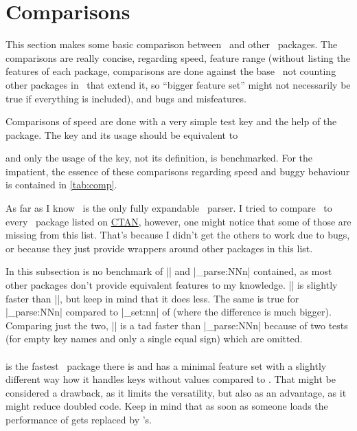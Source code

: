 \section{Comparisons}\label{sec:cmp}

This section makes some basic comparison between \expkv\ and other \kv\
packages. The comparisons are really concise, regarding speed, feature range
(without listing the features of each package, comparisons are done against the
base \expkv\ not counting other packages in \expkvbundle\ that extend it, so
\enquote{bigger feature set} might not necessarily be true if everything is
included), and bugs and misfeatures.

Comparisons of speed are done with a very simple test key and the help of the
\pkg{l3benchmark} package. The key and its usage should be equivalent to
\begin{enverb}[no-tcb]
  \protected{}
  \ekvsetdef{}
\end{enverb}
and only the usage of the key, not its definition, is benchmarked. For the
impatient, the essence of these comparisons regarding speed and buggy
behaviour is contained in \autoref{tab:comp}.

As far as I know \expkv\ is the only fully expandable \kv\ parser. I tried to
compare \expkv\ to every \kv\ package listed on
\href{https://ctan.org/topic/keyval}{CTAN}, however, one might notice that
some of those are missing from this list. That's because I didn't get the
others to work due to bugs, or because they just provide wrappers around other
packages in this list.

In this subsection is no benchmark of |\ekvparse| and |\keyval_parse:NNn|
contained, as most other packages don't provide equivalent features to my
knowledge. |\ekvparse| is slightly faster than |\ekvset|, but keep in mind
that it does less. The same is true for |\keyval_parse:NNn| compared to
|\keys_set:nn| of \pkg{expl3} (where the difference is much bigger). Comparing
just the two, |\ekvparse| is a tad faster than |\keyval_parse:NNn| because of
two tests (for empty key names and only a single equal sign) which are
omitted.

\paragraph{} is the fastest \kv\ package there is and has a minimal
feature set with a slightly different way how it handles keys without values
compared to \expkv. That might be considered a drawback, as it limits the
versatility, but also as an advantage, as it might reduce doubled code. Keep in
mind that as soon as someone loads  the performance of \pkg{keyval}
gets replaced by \pkg{xkeyval}'s.

